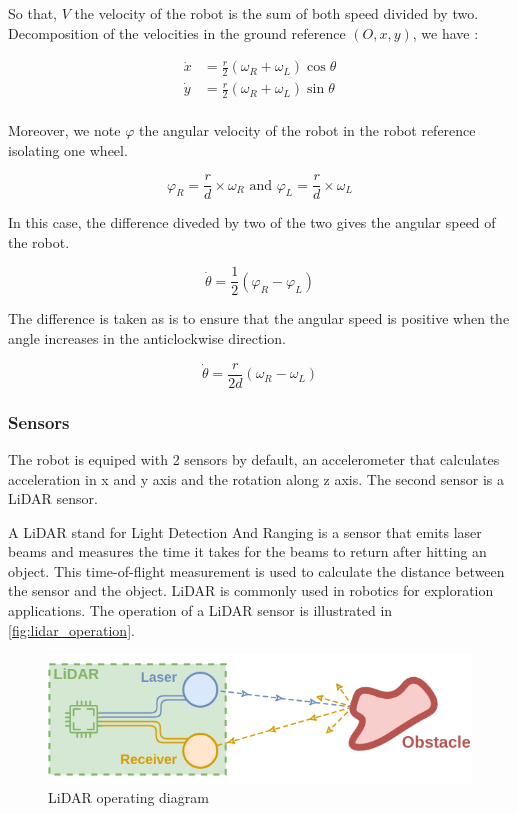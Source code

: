 \documentclass[../main.tex]{subfiles}
\begin{document}
So that, $V$ the velocity of the robot is the sum of both speed divided by two. Decomposition of the velocities in the ground reference $(O, x, y)$, we have :


\begin{align}
	\displaystyle \dot{x} &= \frac{r}{2} \left(\omega_R + \omega_L\right) \cos \theta\\
	\displaystyle \dot{y} &= \frac{r}{2} \left(\omega_R + \omega_L\right) \sin \theta\\
\end{align}


Moreover, we note $\varphi$ the angular velocity of the robot in the robot reference isolating one wheel.


$$\displaystyle \varphi_R = \frac{r}{d} \times \omega_R \text{     and     } \varphi_L =  \frac{r}{d} \times \omega_L$$

In this case, the difference diveded by two of the two gives the angular speed of the robot.

$$\displaystyle \dot{\theta} = \frac{1}{2} \left(\varphi_R - \varphi_L\right)$$

The difference is taken as is to ensure that the angular speed is positive when the angle increases in the anticlockwise direction.

$$\displaystyle \dot{\theta} = \frac{r}{2d} \left(\omega_R - \omega_L\right)$$




\subsubsection{Sensors}

The robot is equiped with 2 sensors by default, an accelerometer that calculates acceleration in x and y axis and the rotation along z axis. The second sensor is a LiDAR sensor.

\vspace{1em}

A LiDAR stand for Light Detection And Ranging is a sensor that emits laser beams and measures the time it takes for the beams to return after hitting an object. This time-of-flight measurement is used to calculate the distance between the sensor and the object. LiDAR is commonly used in robotics for exploration applications. The operation of a LiDAR sensor is illustrated in \autoref{fig:lidar_operation}.

\begin{figure}[H]
	\centering
	\includegraphics[width=0.6\linewidth]{IMAGES/part2/lidar_operation_scheme.png}
	\caption{LiDAR operating diagram}
	\label{fig:lidar_operation}
\end{figure}
\end{document}
